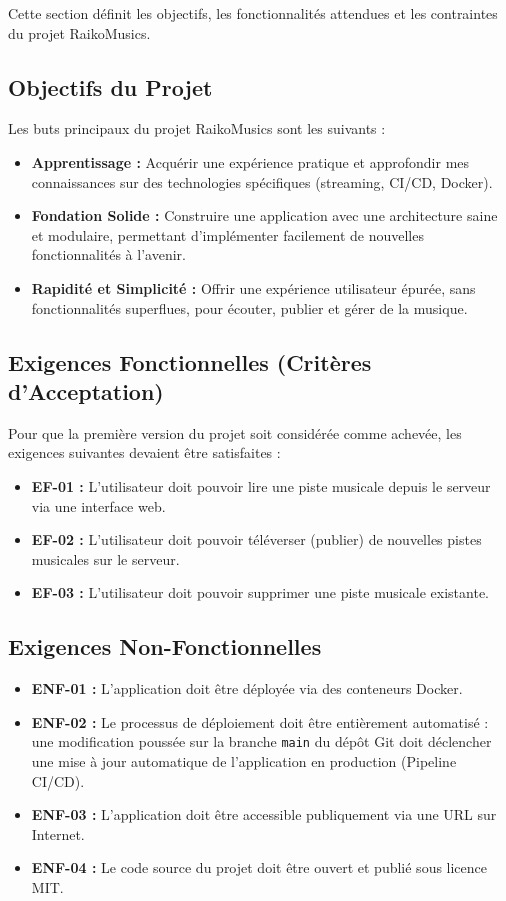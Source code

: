 \documentclass[12pt,a4paper]{article} %
\begin{document}
Cette section définit les objectifs, les fonctionnalités attendues et les contraintes du projet RaikoMusics.

\subsection{Objectifs du Projet}
Les buts principaux du projet RaikoMusics sont les suivants :
\begin{itemize}
    \item \textbf{Apprentissage :} Acquérir une expérience pratique et approfondir mes connaissances sur des technologies spécifiques (streaming, CI/CD, Docker).
    \item \textbf{Fondation Solide :} Construire une application avec une architecture saine et modulaire, permettant d'implémenter facilement de nouvelles fonctionnalités à l'avenir.
    \item \textbf{Rapidité et Simplicité :} Offrir une expérience utilisateur épurée, sans fonctionnalités superflues, pour écouter, publier et gérer de la musique.
\end{itemize}

\subsection{Exigences Fonctionnelles (Critères d'Acceptation)}
Pour que la première version du projet soit considérée comme achevée, les exigences suivantes devaient être satisfaites :
\begin{itemize}
    \item \textbf{EF-01 :} L'utilisateur doit pouvoir lire une piste musicale depuis le serveur via une interface web.
    \item \textbf{EF-02 :} L'utilisateur doit pouvoir téléverser (publier) de nouvelles pistes musicales sur le serveur.
    \item \textbf{EF-03 :} L'utilisateur doit pouvoir supprimer une piste musicale existante.
\end{itemize}

\subsection{Exigences Non-Fonctionnelles}
\begin{itemize}
    \item \textbf{ENF-01 :} L'application doit être déployée via des conteneurs Docker.
    \item \textbf{ENF-02 :} Le processus de déploiement doit être entièrement automatisé : une modification poussée sur la branche \texttt{main} du dépôt Git doit déclencher une mise à jour automatique de l'application en production (Pipeline CI/CD).
    \item \textbf{ENF-03 :} L'application doit être accessible publiquement via une URL sur Internet.
    \item \textbf{ENF-04 :} Le code source du projet doit être ouvert et publié sous licence MIT.
\end{itemize}
\end{document}
